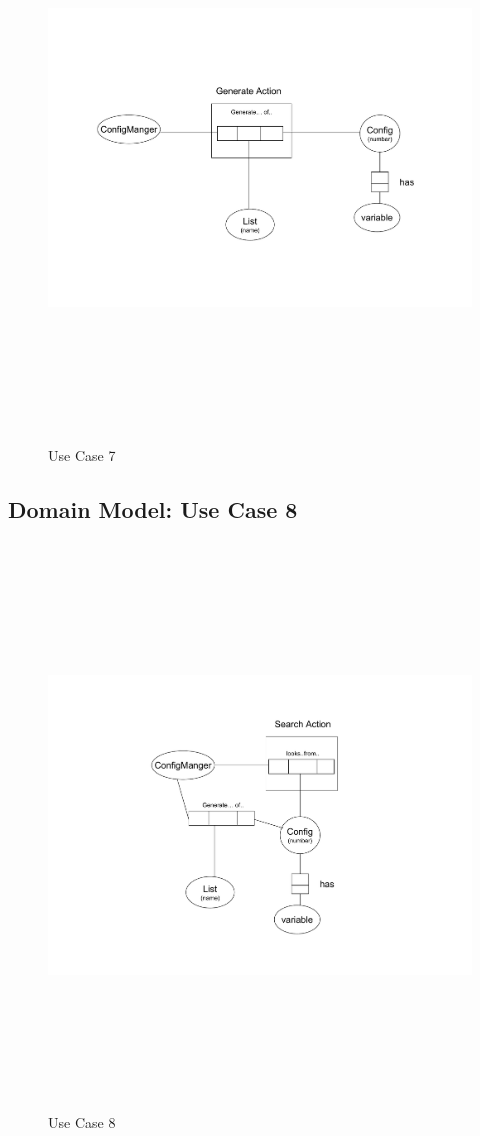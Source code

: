 \begin{figure}[htbp]
  \centering
  \includegraphics[angle=0,width=15cm,height=15cm]{"domainmodel-usecase7"}
  \caption{Use Case 7}
  \label{fig:usecase7}
\end{figure}

\newpage
\subsection{Domain Model: Use Case 8}

\begin{figure}[htbp]
  \centering
  \includegraphics[angle=0,width=15cm,height=15cm]{"domainmodel-usecase8"}
  \caption{Use Case 8}
  \label{fig:usecase8}
\end{figure}


